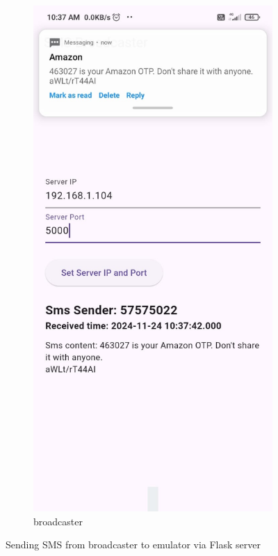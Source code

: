 \documentclass[a4paper,12pt]{article}
\begin{document}
\begin{figure}[h]
\begin{subfigure}[b]{0.2\textwidth}
        \includegraphics[width=\textwidth]{../images/sms-sent-demo.jpeg}
        \caption{broadcaster}
    \end{subfigure}
    \caption{Sending SMS from broadcaster to emulator via Flask server}
\end{figure}
\end{document}
